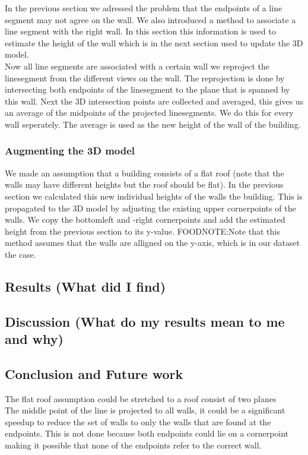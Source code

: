 	In the previous section we adressed the problem that the endpoints of a line segment may not agree on the wall.  We also introduced a method to associate a line segment with the right wall. In this section this information is used to estimate the height of the wall which is in the next section used to update the 3D model.\\
	Now all line segments are associated with a certain wall we reproject the linesegment from the different views on the wall. The reprojection is done by intersecting both endpoints of the linesegment to the plane that is spanned by this wall.
	Next the 3D intersection points are collected and averaged, this gives us an average of the midpoints of the projected linesegments. We do this for every wall seperately.
	The average is used as the new height of the wall of the building.

\subsubsection{Augmenting the 3D model} %
	We made an assumption that a building consists of a flat roof (note that the walls may have different heights but the roof should be flat).
	In the previous section we calculated this new individual heights of the walls the building. 
	This is propagated to the 3D model by adjusting the existing upper cornerpoints of the walls. We copy the bottomleft and -right cornerpoints and add the estimated height from the previous section to its y-value.
	FOODNOTE:Note that this method assumes that the walls are alligned on the y-axis, which is in our dataset the case.


\subsection{Results (What did I find)}
\subsection{Discussion (What do my results mean to me and why)}

\subsection{Conclusion and Future work}
The flat roof assumption could be stretched to a roof consist of two planes
\\
The middle point of the line is projected to all walls, it could be a significant speedup to reduce the set of walls to only the walls that are found at the endpoints. This is not done because both endpoints could lie on a cornerpoint making it possible that none of the endpoints refer to the correct wall.


